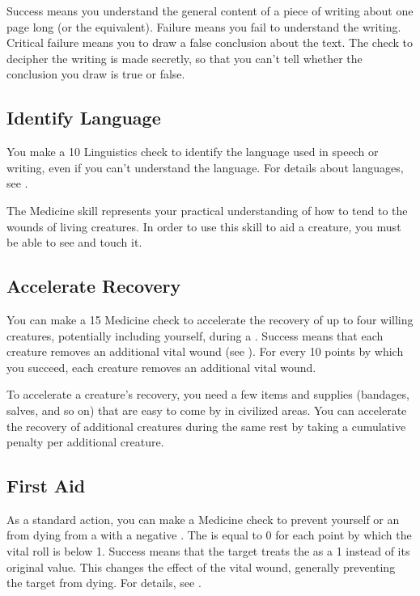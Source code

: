         Success means you understand the general content of a piece of writing about one page long (or the equivalent). Failure means you fail to understand the writing. Critical failure means you to draw a false conclusion about the text. The check to decipher the writing is made secretly, so that you can't tell whether the conclusion you draw is true or false.

    \subsection{Identify Language}
        You make a  10 Linguistics check to identify the language used in speech or writing, even if you can't understand the language.
        For details about languages, see .

\newpage
{}
    The Medicine skill represents your practical understanding of how to tend to the wounds of living creatures.
    In order to use this skill to aid a creature, you must be able to see and touch it.

    \subsection{Accelerate Recovery}\label{Accelerate Recovery}
        You can make a  15 Medicine check to accelerate the recovery of up to four willing creatures, potentially including yourself, during a .
        Success means that each creature removes an additional vital wound (see ).
        For every 10 points by which you succeed, each creature removes an additional vital wound.

        To accelerate a creature's recovery, you need a few items and supplies (bandages, salves, and so on) that are easy to come by in civilized areas.
        You can accelerate the recovery of additional creatures during the same rest by taking a cumulative  penalty per additional creature.

    \subsection{First Aid}\label{First Aid}
        As a standard action, you can make a Medicine check to prevent yourself or an  from dying from a  with a negative .
        The  is equal to 0  for each point by which the vital roll is below 1.
        Success means that the target treats the  as a 1 instead of its original value.
        This changes the effect of the vital wound, generally preventing the target from dying.
        For details, see .

